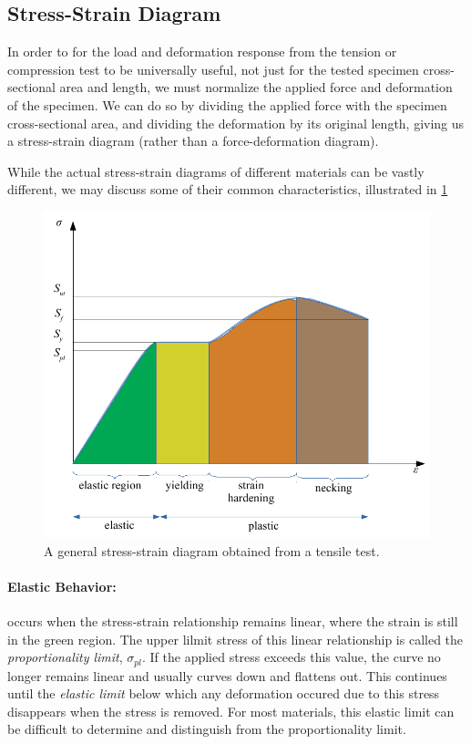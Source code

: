 \documentclass[
10pt,
a4paper,
openany,
svgnames,
]{book} %
\begin{document}
\subsection{Stress-Strain Diagram}

In order to for the load and deformation response from the tension or compression test to be universally useful, not just for the tested specimen cross-sectional area and length, we must normalize the applied force and deformation of the specimen. We can do so by dividing the applied force with the specimen cross-sectional area, and dividing the deformation by its original length, giving us a stress-strain diagram (rather than a force-deformation diagram).

While the actual stress-strain diagrams of different materials can be vastly different, we may discuss some of their common characteristics, illustrated in \cref{fig: stress-strain diagram}

\begin{figure}[h]
  \centering
  \includegraphics[scale=1]{pictures/Basic-material-behavior/stress-strain-diagram}
  \caption{A general stress-strain diagram obtained from a tensile test.}
  \label{fig: stress-strain diagram}
\end{figure}

\paragraph{Elastic Behavior:} occurs when the stress-strain relationship remains linear, where the strain is still in the green region. The upper lilmit stress of this linear relationship is called the \emph{proportionality limit}, $\sigma_{pl}$. If the applied stress exceeds this value, the curve no longer remains linear and usually curves down and flattens out. This continues until the \emph{elastic limit} below which any deformation occured due to this stress disappears when the stress is removed. For most materials, this elastic limit can be difficult to determine and distinguish from the proportionality limit.
\end{document}
